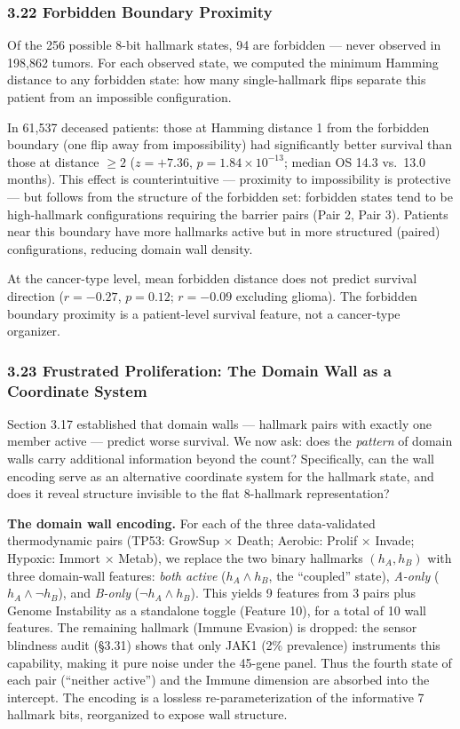 \documentclass[
  11pt,
]{article}
\begin{document}
\subsubsection{3.22 Forbidden Boundary
Proximity}\label{forbidden-boundary-proximity}

Of the 256 possible 8-bit hallmark states, 94 are forbidden --- never
observed in 198,862 tumors. For each observed state, we computed the
minimum Hamming distance to any forbidden state: how many
single-hallmark flips separate this patient from an impossible
configuration.

In 61,537 deceased patients: those at Hamming distance 1 from the
forbidden boundary (one flip away from impossibility) had significantly
better survival than those at distance \(\geq 2\) (\(z = +7.36\),
\(p = 1.84 \times 10^{-13}\); median OS 14.3 vs.~13.0 months). This
effect is counterintuitive --- proximity to impossibility is protective
--- but follows from the structure of the forbidden set: forbidden
states tend to be high-hallmark configurations requiring the barrier
pairs (Pair 2, Pair 3). Patients near this boundary have more hallmarks
active but in more structured (paired) configurations, reducing domain
wall density.

At the cancer-type level, mean forbidden distance does not predict
survival direction (\(r = -0.27\), \(p = 0.12\); \(r = -0.09\) excluding
glioma). The forbidden boundary proximity is a patient-level survival
feature, not a cancer-type organizer.

\subsubsection{3.23 Frustrated Proliferation: The Domain Wall as a
Coordinate
System}\label{frustrated-proliferation-the-domain-wall-as-a-coordinate-system}

Section 3.17 established that domain walls --- hallmark pairs with
exactly one member active --- predict worse survival. We now ask: does
the \emph{pattern} of domain walls carry additional information beyond
the count? Specifically, can the wall encoding serve as an alternative
coordinate system for the hallmark state, and does it reveal structure
invisible to the flat 8-hallmark representation?

\textbf{The domain wall encoding.} For each of the three data-validated
thermodynamic pairs (TP53: GrowSup × Death; Aerobic: Prolif × Invade;
Hypoxic: Immort × Metab), we replace the two binary hallmarks
\((h_A, h_B)\) with three domain-wall features: \emph{both active}
(\(h_A \wedge h_B\), the ``coupled'' state), \emph{A-only}
(\(h_A \wedge \neg h_B\)), and \emph{B-only} (\(\neg h_A \wedge h_B\)).
This yields 9 features from 3 pairs plus Genome Instability as a
standalone toggle (Feature 10), for a total of 10 wall features. The
remaining hallmark (Immune Evasion) is dropped: the sensor blindness
audit (§3.31) shows that only JAK1 (2\% prevalence) instruments this
capability, making it pure noise under the 45-gene panel. Thus the
fourth state of each pair (``neither active'') and the Immune dimension
are absorbed into the intercept. The encoding is a lossless
re-parameterization of the informative 7 hallmark bits, reorganized to
expose wall structure.
\end{document}
